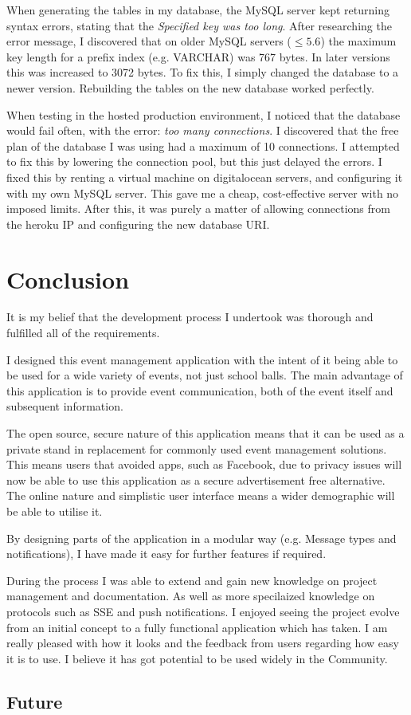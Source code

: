 \documentclass[a4paper,oneside,12pt]{report}
\begin{document}
	When generating the tables in my database, the MySQL server kept returning syntax errors, stating that the \textit{Specified key was too long}. After researching the error message, I discovered that on older MySQL servers (\(\leq 5.6\)) the maximum key length for a prefix index (e.g. VARCHAR) was 767 bytes. In later versions this was increased to 3072 bytes. To fix this, I simply changed the database to a newer version. Rebuilding the tables on the new database worked perfectly.
	
	When testing in the hosted production environment, I noticed that the database would fail often, with the error: \textit{too many connections}. I discovered that the free plan of the database I was using had a maximum of 10 connections. I attempted to fix this by lowering the connection pool, but this just delayed the errors. I fixed this by renting a virtual machine on digitalocean servers, and configuring it with my own MySQL server. This gave me a cheap, cost-effective server with no imposed limits. After this, it was purely a matter of allowing connections from the heroku IP and configuring the new database URI.
	

	\chapter{Conclusion}
	It is my belief that the development process I undertook was thorough and fulfilled all of the requirements.
	
	I designed this event management application with the intent of it being able to be used for a wide variety of events, not just school balls.  The main advantage of this application is to provide event communication, both of the event itself and subsequent information. 
	
	The open source, secure nature of this application means that it can be used as a private stand in replacement for commonly used event management solutions. This means users that avoided apps, such as Facebook, due to privacy issues will now be able to use this application as a secure advertisement free alternative. The online nature and simplistic user interface means a wider demographic will be able to utilise it.
	
	By designing parts of the application in a modular way (e.g. Message types and notifications), I have made it easy for further features if required.
	
	During the process I was able to extend and gain new knowledge on project management and documentation. As well as more specilaized knowledge on protocols such as SSE and push notifications. I enjoyed seeing the project evolve from an initial concept to a fully functional application which has taken.  I am really pleased with how it looks and the feedback from users regarding how easy it is to use.  I believe it has got potential to be used widely in the Community.
	
	\section{Future}

	\printbibliography

	\printglossaries
\end{document}
